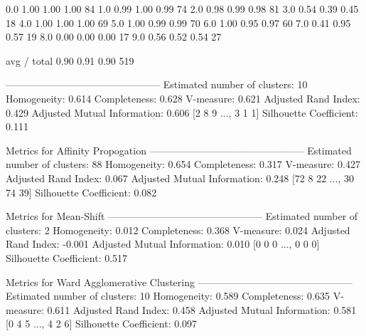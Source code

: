         0.0       1.00      1.00      1.00        84
        1.0       0.99      1.00      0.99        74
        2.0       0.98      0.99      0.98        81
        3.0       0.54      0.39      0.45        18
        4.0       1.00      1.00      1.00        69
        5.0       1.00      0.99      0.99        70
        6.0       1.00      0.95      0.97        60
        7.0       0.41      0.95      0.57        19
        8.0       0.00      0.00      0.00        17
        9.0       0.56      0.52      0.54        27

avg / total       0.90      0.91      0.90       519

-----------------------------------------------
Estimated number of clusters: 10
Homogeneity: 0.614
Completeness: 0.628
V-measure: 0.621
Adjusted Rand Index: 0.429
Adjusted Mutual Information: 0.606
[2 8 9 ..., 3 1 1]
Silhouette Coefficient: 0.111

Metrics for Affinity Propogation
-----------------------------------------------
Estimated number of clusters: 88
Homogeneity: 0.654
Completeness: 0.317
V-measure: 0.427
Adjusted Rand Index: 0.067
Adjusted Mutual Information: 0.248
[72  8 22 ..., 30 74 39]
Silhouette Coefficient: 0.082

Metrics for Mean-Shift
-----------------------------------------------
Estimated number of clusters: 2
Homogeneity: 0.012
Completeness: 0.368
V-measure: 0.024
Adjusted Rand Index: -0.001
Adjusted Mutual Information: 0.010
[0 0 0 ..., 0 0 0]
Silhouette Coefficient: 0.517

Metrics for Ward Agglomerative Clustering
-----------------------------------------------
Estimated number of clusters: 10
Homogeneity: 0.589
Completeness: 0.635
V-measure: 0.611
Adjusted Rand Index: 0.458
Adjusted Mutual Information: 0.581
[0 4 5 ..., 4 2 6]
Silhouette Coefficient: 0.097
